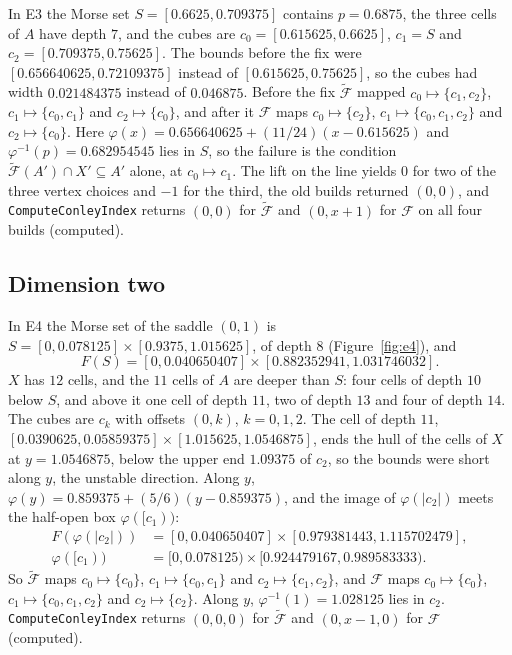 \documentclass[11pt]{article}
\theoremstyle{plain}
\theoremstyle{definition}
\theoremstyle{remark}
\newcommand{\Fc}{\mathcal{F}}
\newcommand{\Ft}{\tilde{\mathcal{F}}}
\newcommand{\code}[1]{\texttt{#1}}
\begin{document}
In E3 the Morse set $S=[0.6625,0.709375]$ contains $p=0.6875$, the three cells of $A$ have depth $7$, and the cubes are $c_0=[0.615625,0.6625]$, $c_1=S$ and $c_2=[0.709375,0.75625]$. The bounds before the fix were $[0.656640625,0.72109375]$ instead of $[0.615625,0.75625]$, so the cubes had width $0.021484375$ instead of $0.046875$. Before the fix $\Ft$ mapped $c_0\mapsto\{c_1,c_2\}$, $c_1\mapsto\{c_0,c_1\}$ and $c_2\mapsto\{c_0\}$, and after it $\Fc$ maps $c_0\mapsto\{c_2\}$, $c_1\mapsto\{c_0,c_1,c_2\}$ and $c_2\mapsto\{c_0\}$. Here $\varphi(x)=0.656640625+(11/24)(x-0.615625)$ and $\varphi^{-1}(p)=0.682954545$ lies in $S$, so the failure is the condition $\Ft(A')\cap X'\subseteq A'$ alone, at $c_0\mapsto c_1$. The lift on the line yields $0$ for two of the three vertex choices and $-1$ for the third, the old builds returned $(0,0)$, and \code{ComputeConleyIndex} returns $(0,0)$ for $\Ft$ and $(0,x+1)$ for $\Fc$ on all four builds (computed).

\subsection{Dimension two}\label{sec:2d}

In E4 the Morse set of the saddle $(0,1)$ is $S=[0,0.078125]\times[0.9375,1.015625]$, of depth $8$ (Figure~\ref{fig:e4}), and
\[
F(S)=[0,0.040650407]\times[0.882352941,1.031746032].
\]
$X$ has $12$ cells, and the $11$ cells of $A$ are deeper than $S$: four cells of depth $10$ below $S$, and above it one cell of depth $11$, two of depth $13$ and four of depth $14$. The cubes are $c_k$ with offsets $(0,k)$, $k=0,1,2$. The cell of depth $11$, $[0.0390625,0.05859375]\times[1.015625,1.0546875]$, ends the hull of the cells of $X$ at $y=1.0546875$, below the upper end $1.09375$ of $c_2$, so the bounds were short along $y$, the unstable direction. Along $y$, $\varphi(y)=0.859375+(5/6)(y-0.859375)$, and the image of $\varphi(|c_2|)$ meets the half-open box $\varphi([c_1))$:
\[
\begin{aligned}
F(\varphi(|c_2|))&=[0,0.040650407]\times[0.979381443,1.115702479],\\
\varphi([c_1))&=[0,0.078125)\times[0.924479167,0.989583333).
\end{aligned}
\]
So $\Ft$ maps $c_0\mapsto\{c_0\}$, $c_1\mapsto\{c_0,c_1\}$ and $c_2\mapsto\{c_1,c_2\}$, and $\Fc$ maps $c_0\mapsto\{c_0\}$, $c_1\mapsto\{c_0,c_1,c_2\}$ and $c_2\mapsto\{c_2\}$. Along $y$, $\varphi^{-1}(1)=1.028125$ lies in $c_2$. \code{ComputeConleyIndex} returns $(0,0,0)$ for $\Ft$ and $(0,x-1,0)$ for $\Fc$ (computed).
\end{document}
